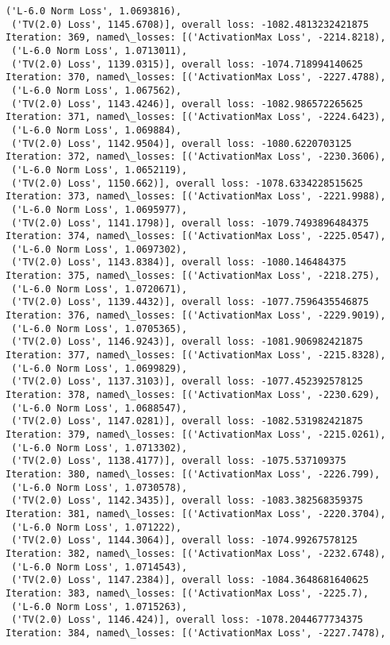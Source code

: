 \documentclass[10pt]{article}
\begin{document}
\begin{Verbatim}[commandchars=\\\{\}]
 ('L-6.0 Norm Loss', 1.0693816),
 ('TV(2.0) Loss', 1145.6708)], overall loss: -1082.4813232421875
Iteration: 369, named\_losses: [('ActivationMax Loss', -2214.8218),
 ('L-6.0 Norm Loss', 1.0713011),
 ('TV(2.0) Loss', 1139.0315)], overall loss: -1074.718994140625
Iteration: 370, named\_losses: [('ActivationMax Loss', -2227.4788),
 ('L-6.0 Norm Loss', 1.067562),
 ('TV(2.0) Loss', 1143.4246)], overall loss: -1082.986572265625
Iteration: 371, named\_losses: [('ActivationMax Loss', -2224.6423),
 ('L-6.0 Norm Loss', 1.069884),
 ('TV(2.0) Loss', 1142.9504)], overall loss: -1080.6220703125
Iteration: 372, named\_losses: [('ActivationMax Loss', -2230.3606),
 ('L-6.0 Norm Loss', 1.0652119),
 ('TV(2.0) Loss', 1150.662)], overall loss: -1078.6334228515625
Iteration: 373, named\_losses: [('ActivationMax Loss', -2221.9988),
 ('L-6.0 Norm Loss', 1.0695977),
 ('TV(2.0) Loss', 1141.1798)], overall loss: -1079.7493896484375
Iteration: 374, named\_losses: [('ActivationMax Loss', -2225.0547),
 ('L-6.0 Norm Loss', 1.0697302),
 ('TV(2.0) Loss', 1143.8384)], overall loss: -1080.146484375
Iteration: 375, named\_losses: [('ActivationMax Loss', -2218.275),
 ('L-6.0 Norm Loss', 1.0720671),
 ('TV(2.0) Loss', 1139.4432)], overall loss: -1077.7596435546875
Iteration: 376, named\_losses: [('ActivationMax Loss', -2229.9019),
 ('L-6.0 Norm Loss', 1.0705365),
 ('TV(2.0) Loss', 1146.9243)], overall loss: -1081.906982421875
Iteration: 377, named\_losses: [('ActivationMax Loss', -2215.8328),
 ('L-6.0 Norm Loss', 1.0699829),
 ('TV(2.0) Loss', 1137.3103)], overall loss: -1077.452392578125
Iteration: 378, named\_losses: [('ActivationMax Loss', -2230.629),
 ('L-6.0 Norm Loss', 1.0688547),
 ('TV(2.0) Loss', 1147.0281)], overall loss: -1082.531982421875
Iteration: 379, named\_losses: [('ActivationMax Loss', -2215.0261),
 ('L-6.0 Norm Loss', 1.0713302),
 ('TV(2.0) Loss', 1138.4177)], overall loss: -1075.537109375
Iteration: 380, named\_losses: [('ActivationMax Loss', -2226.799),
 ('L-6.0 Norm Loss', 1.0730578),
 ('TV(2.0) Loss', 1142.3435)], overall loss: -1083.382568359375
Iteration: 381, named\_losses: [('ActivationMax Loss', -2220.3704),
 ('L-6.0 Norm Loss', 1.071222),
 ('TV(2.0) Loss', 1144.3064)], overall loss: -1074.99267578125
Iteration: 382, named\_losses: [('ActivationMax Loss', -2232.6748),
 ('L-6.0 Norm Loss', 1.0714543),
 ('TV(2.0) Loss', 1147.2384)], overall loss: -1084.3648681640625
Iteration: 383, named\_losses: [('ActivationMax Loss', -2225.7),
 ('L-6.0 Norm Loss', 1.0715263),
 ('TV(2.0) Loss', 1146.424)], overall loss: -1078.2044677734375
Iteration: 384, named\_losses: [('ActivationMax Loss', -2227.7478),

\end{Verbatim}
\end{document}

